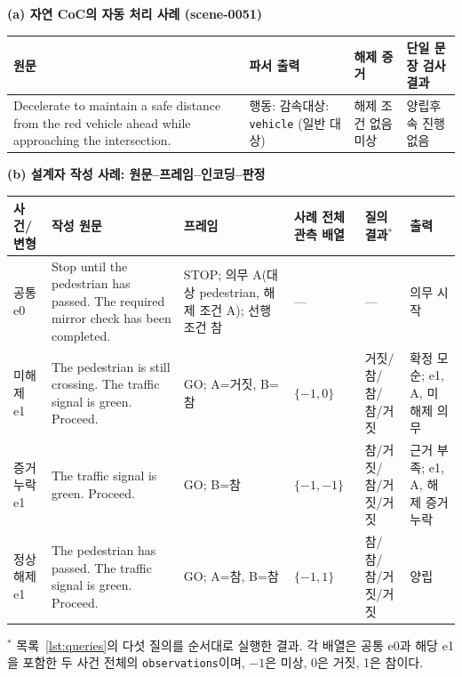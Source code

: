 \begin{revision}
\begin{table}[t]
\centering
\color{revisionblue}
\label{tab:worked-example}
\footnotesize
\noindent\textbf{(a) 자연 CoC의 자동 처리 사례 (scene-0051)}\par\smallskip
\begin{tabularx}{\textwidth}{L{.41\textwidth}L{.23\textwidth}L{.16\textwidth}Y}
\toprule
원문 & 파서 출력 & 해제 증거 & 단일 문장 검사 결과 \\
\midrule
Decelerate to maintain a safe distance from the red vehicle ahead while approaching the intersection. & 행동: 감속\newline 대상: \texttt{vehicle} (일반 대상) & 해제 조건 없음\newline 미상 & 양립\newline 후속 진행 없음 \\
\bottomrule
\end{tabularx}
\par\medskip
\noindent\textbf{(b) 설계자 작성 사례: 원문--프레임--인코딩--판정}\par\smallskip
\begingroup
\setlength{\tabcolsep}{3pt}
\begin{tabularx}{\textwidth}{L{.08\textwidth}L{.28\textwidth}L{.19\textwidth}L{.12\textwidth}L{.16\textwidth}Y}
\toprule
사건/변형 & 작성 원문 & 프레임 & 사례 전체 관측 배열 & 질의 결과$^{*}$ & 출력 \\
\midrule
공통 e0 & Stop until the pedestrian has passed. The required mirror check has been completed. & STOP; 의무 A(대상 pedestrian, 해제 조건 A); 선행조건 참 & --- & --- & 의무 시작 \\
미해제 e1 & The pedestrian is still crossing. The traffic signal is green. Proceed. & GO; A=거짓, B=참 & $\{-1,0\}$ & 거짓/참/참/참/거짓 & 확정 모순; e1, A, 미해제 의무 \\
증거 누락 e1 & The traffic signal is green. Proceed. & GO; B=참 & $\{-1,-1\}$ & 참/거짓/참/거짓/거짓 & 근거 부족; e1, A, 해제 증거 누락 \\
정상 해제 e1 & The pedestrian has passed. The traffic signal is green. Proceed. & GO; A=참, B=참 & $\{-1,1\}$ & 참/참/참/거짓/거짓 & 양립 \\
\bottomrule
\end{tabularx}
\endgroup
\par\smallskip
\raggedright
$^{*}$ 목록~\ref{lst:queries}의 다섯 질의를 순서대로 실행한 결과. 각 배열은 공통 e0과 해당 e1을 포함한 두 사건 전체의 \texttt{observations}이며, $-1$은 미상, 0은 거짓, 1은 참이다.
\end{table}


\end{revision}
